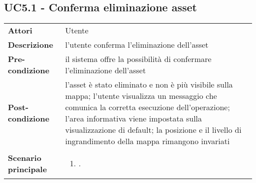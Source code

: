 \subsection{UC5.1 - Conferma eliminazione asset} 
\label{sssec:UC5.1} 
\def\arraystretch{1.5}
\begin{tabularx}{\textwidth}{l|p{}}
	\rowcolor{I} \multicolumn{2}{c}{\color{white}\textbf{UC5.1 - Conferma eliminazione asset}} \\
	\toprule
	\endhead
	\textbf{Attori} & Utente\\
	\textbf{Descrizione} & l'utente conferma l'eliminazione dell'asset\\
	\textbf{Pre-condizione} & il sistema offre la possibilità di confermare l'eliminazione dell'asset\\
	\textbf{Post-condizione} & l'asset è stato eliminato e non è più visibile sulla mappa; l'utente visualizza un messaggio che comunica la corretta esecuzione dell'operazione;  l'area informativa viene impostata sulla visualizzazione di default; la posizione e il livello di ingrandimento della mappa rimangono invariati\\
	\textbf{Scenario principale} & \vspace{-1.2em}\begin{enumerate}[leftmargin=*,noitemsep,nosep]
		\item \nameref{sssec:UC5.1}.
	\end{enumerate}\\
	\bottomrule
\end{tabularx}
